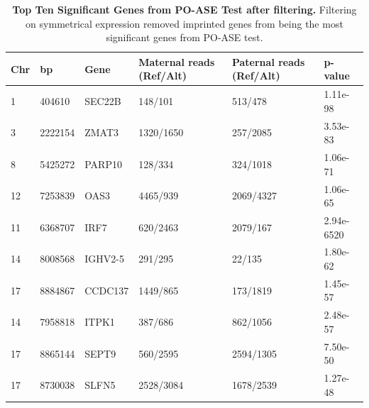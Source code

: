 \begin{table}[!htb]
\centering
\begin{adjustbox}{width={\textwidth}}
\begin{tabular}{@{}p{1cm}p{3cm}p{3cm}p{5cm}p{5cm}p{3cm}@{}}
 \toprule  Chr & bp & Gene & Maternal reads (Ref/Alt) & Paternal reads (Ref/Alt) & p-value \\ \midrule
1 & 404610 & SEC22B & 148/101 & 513/478 & 1.11e-98 \\
3 & 2222154 & ZMAT3 & 1320/1650 & 257/2085 & 3.53e-83\\
8 & 5425272 & PARP10 & 128/334 & 324/1018 & 1.06e-71 \\
12 & 7253839 & OAS3 & 4465/939 & 2069/4327 & 1.06e-65 \\
11 & 6368707 & IRF7 & 620/2463 & 2079/167 & 2.94e-6520 \\
14 & 8008568 & IGHV2-5 & 291/295 & 22/135 & 1.80e-62 \\
17 & 8884867 & CCDC137 & 1449/865 & 173/1819 & 1.45e-57\\
14 & 7958818 & ITPK1 & 387/686 & 862/1056 & 2.48e-57\\
17 & 8865144 & SEPT9 & 560/2595 & 2594/1305 & 7.50e-50\\
17 & 8730038 & SLFN5 & 2528/3084 & 1678/2539 & 1.27e-48\\  \bottomrule
\end{tabular}
\end{adjustbox}
\caption[Top Ten Significant Genes from PO-ASE Test after filtering.]{\textbf{Top Ten Significant Genes from PO-ASE Test after filtering.} Filtering on symmetrical expression removed imprinted genes from being the most significant genes from PO-ASE test.}
\label{tab:poase2}
\end{table}



